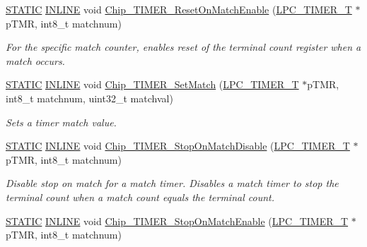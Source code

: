 \begin{DoxyCompactItemize}
\hyperlink{group__LPC__Types__Public__Macros_ga10b2d890d871e1489bb02b7e70d9bdfb}{S\+T\+A\+T\+IC} \hyperlink{group__LPC__Types__Public__Types_ga2eb6f9e0395b47b8d5e3eeae4fe0c116}{I\+N\+L\+I\+NE} void \hyperlink{group__TIMER__17XX__40XX_ga4b8a551b290e9f70ba8b8569e2937f58}{Chip\+\_\+\+T\+I\+M\+E\+R\+\_\+\+Reset\+On\+Match\+Enable} (\hyperlink{structLPC__TIMER__T}{L\+P\+C\+\_\+\+T\+I\+M\+E\+R\+\_\+T} $\ast$p\+T\+MR, int8\+\_\+t matchnum)
\begin{DoxyCompactList}\small\item\em For the specific match counter, enables reset of the terminal count register when a match occurs. \end{DoxyCompactList}\item 
\hyperlink{group__LPC__Types__Public__Macros_ga10b2d890d871e1489bb02b7e70d9bdfb}{S\+T\+A\+T\+IC} \hyperlink{group__LPC__Types__Public__Types_ga2eb6f9e0395b47b8d5e3eeae4fe0c116}{I\+N\+L\+I\+NE} void \hyperlink{group__TIMER__17XX__40XX_gaff98bdf0254cd7783c7b42655fa43cd2}{Chip\+\_\+\+T\+I\+M\+E\+R\+\_\+\+Set\+Match} (\hyperlink{structLPC__TIMER__T}{L\+P\+C\+\_\+\+T\+I\+M\+E\+R\+\_\+T} $\ast$p\+T\+MR, int8\+\_\+t matchnum, uint32\+\_\+t matchval)
\begin{DoxyCompactList}\small\item\em Sets a timer match value. \end{DoxyCompactList}\item 
\hyperlink{group__LPC__Types__Public__Macros_ga10b2d890d871e1489bb02b7e70d9bdfb}{S\+T\+A\+T\+IC} \hyperlink{group__LPC__Types__Public__Types_ga2eb6f9e0395b47b8d5e3eeae4fe0c116}{I\+N\+L\+I\+NE} void \hyperlink{group__TIMER__17XX__40XX_gae1be576a72246ab2255f735245fb49a7}{Chip\+\_\+\+T\+I\+M\+E\+R\+\_\+\+Stop\+On\+Match\+Disable} (\hyperlink{structLPC__TIMER__T}{L\+P\+C\+\_\+\+T\+I\+M\+E\+R\+\_\+T} $\ast$p\+T\+MR, int8\+\_\+t matchnum)
\begin{DoxyCompactList}\small\item\em Disable stop on match for a match timer. Disables a match timer to stop the terminal count when a match count equals the terminal count. \end{DoxyCompactList}\item 
\hyperlink{group__LPC__Types__Public__Macros_ga10b2d890d871e1489bb02b7e70d9bdfb}{S\+T\+A\+T\+IC} \hyperlink{group__LPC__Types__Public__Types_ga2eb6f9e0395b47b8d5e3eeae4fe0c116}{I\+N\+L\+I\+NE} void \hyperlink{group__TIMER__17XX__40XX_gaf76a0a1282598f976f04c00595b6332c}{Chip\+\_\+\+T\+I\+M\+E\+R\+\_\+\+Stop\+On\+Match\+Enable} (\hyperlink{structLPC__TIMER__T}{L\+P\+C\+\_\+\+T\+I\+M\+E\+R\+\_\+T} $\ast$p\+T\+MR, int8\+\_\+t matchnum)

\end{DoxyCompactItemize}
